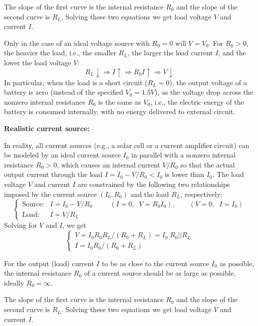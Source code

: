 \begin{itemize}

The slope of the first curve is the internal resistance $R_0$ and the slope 
of the second curve is $R_L$. Solving these two equations we get load voltage
$V$ and current $I$.

Only in the case of an ideal voltage source with $R_0=0$ will $V=V_0$. 
For $R_0>0$, the heavier the load, i.e., the smaller $R_L$, the larger the 
load current $I$, and the lower the load voltage $V$:
\[
R_L \downarrow \Longrightarrow I \uparrow \Longrightarrow R_0I \uparrow
\Longrightarrow V \downarrow 
\]
In particular, when the load is a short circuit ($R_L=0$), the output 
voltage of a battery is zero (instead of the specified $V_0=1.5V$), as 
the voltage drop across the nonzero internal resistance $R_0$ is the same 
as $V_0$, i.e., the electric energy of the battery is consumed internally,
with no energy delivered to external circuit.


{\bf Realistic current source:} 

In reality, all current sources (e.g., a solar cell or a current amplifier
circuit) can be modeled by an ideal current source $I_0$ in parallel with a 
nonzero internal resistance $R_0>0$, which causes an internal current $V/R_0$
so that the actual output current through the load $I=I_0-V/R_0<I_0$ is lower 
than $I_0$. The load voltage $V$ and current $I$ are constrained by the 
following two relationships imposed by the current source $(I_0, R_0)$ and 
the load $R_L$, respectively:
\[ 
\left\{ \begin{array}{ll} 
  \mbox{Source:} & I=I_0-V/R_0\;\;\;\;\;\;\;\;\;
  (I=0,\;\;V=R_0I_0),\;\;\;\;\;\;\;(V=0,\;\;I=I_0) \\ 
  \mbox{Load:} & I=V/R_L \end{array} \right.
\]
Solving for $V$ and $I$, we get
\[
\left\{ \begin{array}{l} V=I_0R_0R_L/(R_0+R_L)=I_0\;R_0||R_L \\
  I=I_0R_0/(R_0+R_L)\end{array} \right.
\]


For the output (load) current $I$ to be as close to the current source $I_0$
as possible, the internal resistance $R_0$ of a current source should be as
large as possible, ideally $R_0=\infty$.


The slope of the first curve is the internal resistance $R_0$ and the slope 
of the second curve is $R_L$. Solving these two equations we get load voltage
$V$ and current $I$.


\end{itemize}
